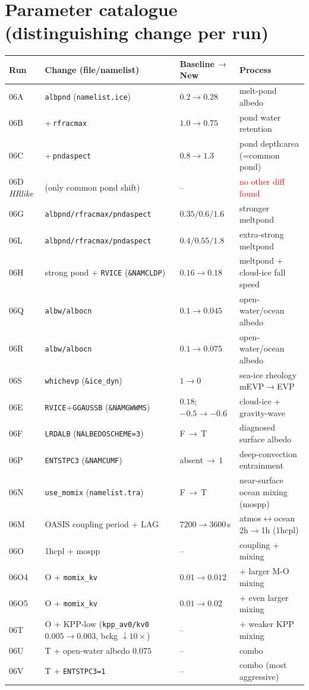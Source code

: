 \documentclass[10pt]{article}
\begin{document}
\section{Parameter catalogue (distinguishing change per run)}\label{app:params}
\begin{center}\footnotesize
\begin{tabular}{l l l l}
\toprule
Run & Change (file/namelist) & Baseline\,$\to$\,New & Process \\
\midrule
06A & \texttt{albpnd} (\texttt{namelist.ice}) & $0.2\to0.28$ & melt-pond albedo \\
06B & +\,\texttt{rfracmax} & $1.0\to0.75$ & pond water retention \\
06C & +\,\texttt{pndaspect} & $0.8\to1.3$ & pond depth:area (=common pond) \\
06D \emph{HRlike} & (only common pond shift) & -- & \textcolor{red}{no other diff found} \\
06G & \texttt{albpnd/rfracmax/pndaspect} & $0.35/0.6/1.6$ & stronger meltpond \\
06L & \texttt{albpnd/rfracmax/pndaspect} & $0.4/0.55/1.8$ & extra-strong meltpond \\
06H & strong pond + \texttt{RVICE} (\texttt{\&NAMCLDP}) & $0.16\to0.18$ & meltpond + cloud-ice fall speed \\
06Q & \texttt{albw/albocn} & $0.1\to0.045$ & open-water/ocean albedo \\
06R & \texttt{albw/albocn} & $0.1\to0.075$ & open-water/ocean albedo \\
06S & \texttt{whichevp} (\texttt{\&ice\_dyn}) & $1\to0$ & sea-ice rheology mEVP$\to$EVP \\
06E & \texttt{RVICE}+\texttt{GGAUSSB} (\texttt{\&NAMGWWMS}) & $0.18$; $-0.5\to-0.6$ & cloud-ice + gravity-wave \\
06F & \texttt{LRDALB} (\texttt{NALBEDOSCHEME=3}) & F\,$\to$\,T & diagnosed surface albedo \\
06P & \texttt{ENTSTPC3} (\texttt{\&NAMCUMF}) & absent\,$\to$\,1 & deep-convection entrainment \\
06N & \texttt{use\_momix} (\texttt{namelist.tra}) & F\,$\to$\,T & near-surface ocean mixing (mospp) \\
06M & OASIS coupling period + LAG & $7200\to3600$\,s & atmos$\leftrightarrow$ocean 2h$\to$1h (1hcpl) \\
06O & 1hcpl + mospp & -- & coupling + mixing \\
06O4 & O + \texttt{momix\_kv} & $0.01\to0.012$ & + larger M-O mixing \\
06O5 & O + \texttt{momix\_kv} & $0.01\to0.02$ & + even larger mixing \\
06T & O + KPP-low (\texttt{kpp\_av0/kv0} $0.005\to0.003$, bckg $\downarrow10\times$) & -- & + weaker KPP mixing \\
06U & T + open-water albedo $0.075$ & -- & combo \\
06V & T + \texttt{ENTSTPC3=1} & -- & combo (most aggressive) \\
\bottomrule
\end{tabular}
\end{center}
\end{document}

